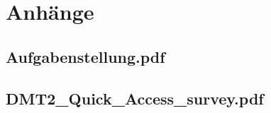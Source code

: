 \chapter{Anhänge}
\section{Aufgabenstellung.pdf}
\label{anhang:aufgabenstellung}



\section{DMT2\_Quick\_Access\_survey.pdf}
\label{anhang:survey}
